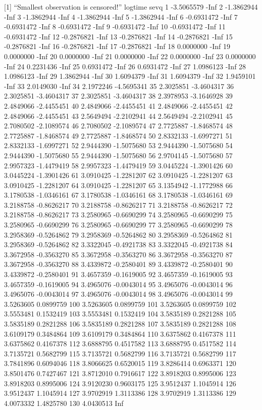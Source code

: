 \documentclass[
]{article}
\begin{document}
{[}1{]} ``Smallest observation is censored!'' logtime sevq 1 -3.5065579
-Inf 2 -1.3862944 -Inf 3 -1.3862944 -Inf 4 -1.3862944 -Inf 5 -1.3862944
-Inf 6 -0.6931472 -Inf 7 -0.6931472 -Inf 8 -0.6931472 -Inf 9 -0.6931472
-Inf 10 -0.6931472 -Inf 11 -0.6931472 -Inf 12 -0.2876821 -Inf 13
-0.2876821 -Inf 14 -0.2876821 -Inf 15 -0.2876821 -Inf 16 -0.2876821 -Inf
17 -0.2876821 -Inf 18 0.0000000 -Inf 19 0.0000000 -Inf 20 0.0000000 -Inf
21 0.0000000 -Inf 22 0.0000000 -Inf 23 0.0000000 -Inf 24 0.2231436 -Inf
25 0.6931472 -Inf 26 0.6931472 -Inf 27 1.0986123 -Inf 28 1.0986123 -Inf
29 1.3862944 -Inf 30 1.6094379 -Inf 31 1.6094379 -Inf 32 1.9459101 -Inf
33 2.0149030 -Inf 34 2.1972246 -4.5695341 35 2.3025851 -3.4604317 36
2.3025851 -3.4604317 37 2.3025851 -3.4604317 38 2.3978953 -3.1646928 39
2.4849066 -2.4455451 40 2.4849066 -2.4455451 41 2.4849066 -2.4455451 42
2.4849066 -2.4455451 43 2.5649494 -2.2102941 44 2.5649494 -2.2102941 45
2.7080502 -2.1089574 46 2.7080502 -2.1089574 47 2.7725887 -1.8468574 48
2.7725887 -1.8468574 49 2.7725887 -1.8468574 50 2.8332133 -1.6997271 51
2.8332133 -1.6997271 52 2.9444390 -1.5075680 53 2.9444390 -1.5075680 54
2.9444390 -1.5075680 55 2.9444390 -1.5075680 56 2.9704145 -1.5075680 57
2.9957323 -1.4479419 58 2.9957323 -1.4479419 59 3.0445224 -1.3901426 60
3.0445224 -1.3901426 61 3.0910425 -1.2281207 62 3.0910425 -1.2281207 63
3.0910425 -1.2281207 64 3.0910425 -1.2281207 65 3.1354942 -1.1772988 66
3.1780538 -1.0346161 67 3.1780538 -1.0346161 68 3.1780538 -1.0346161 69
3.2188758 -0.8626217 70 3.2188758 -0.8626217 71 3.2188758 -0.8626217 72
3.2188758 -0.8626217 73 3.2580965 -0.6690299 74 3.2580965 -0.6690299 75
3.2580965 -0.6690299 76 3.2580965 -0.6690299 77 3.2580965 -0.6690299 78
3.2958369 -0.5264862 79 3.2958369 -0.5264862 80 3.2958369 -0.5264862 81
3.2958369 -0.5264862 82 3.3322045 -0.4921738 83 3.3322045 -0.4921738 84
3.3672958 -0.3563270 85 3.3672958 -0.3563270 86 3.3672958 -0.3563270 87
3.3672958 -0.3563270 88 3.4339872 -0.2580401 89 3.4339872 -0.2580401 90
3.4339872 -0.2580401 91 3.4657359 -0.1619005 92 3.4657359 -0.1619005 93
3.4657359 -0.1619005 94 3.4965076 -0.0043014 95 3.4965076 -0.0043014 96
3.4965076 -0.0043014 97 3.4965076 -0.0043014 98 3.4965076 -0.0043014 99
3.5263605 0.0899759 100 3.5263605 0.0899759 101 3.5263605 0.0899759 102
3.5553481 0.1532419 103 3.5553481 0.1532419 104 3.5835189 0.2821288 105
3.5835189 0.2821288 106 3.5835189 0.2821288 107 3.5835189 0.2821288 108
3.6109179 0.3484864 109 3.6109179 0.3484864 110 3.6375862 0.4167378 111
3.6375862 0.4167378 112 3.6888795 0.4517582 113 3.6888795 0.4517582 114
3.7135721 0.5682799 115 3.7135721 0.5682799 116 3.7135721 0.5682799 117
3.7841896 0.6094046 118 3.8066625 0.6520015 119 3.8286414 0.6963371 120
3.8501476 0.7427467 121 3.8712010 0.7916617 122 3.8918203 0.8995006 123
3.8918203 0.8995006 124 3.9120230 0.9603175 125 3.9512437 1.1045914 126
3.9512437 1.1045914 127 3.9702919 1.3113386 128 3.9702919 1.3113386 129
4.0073332 1.4825780 130 4.0430513 Inf
\end{document}
